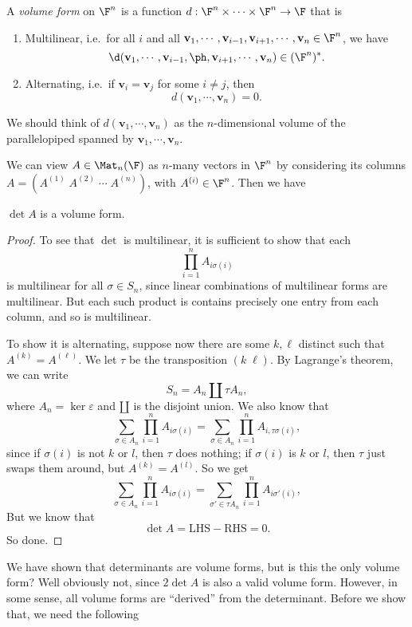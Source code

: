 \documentclass[a4paper]{article}
\begin{document}
\begin{defi}
  A \emph{volume form} on $\F^n$ is a function $d: \F^n \times \cdots \times \F^n \to \F$ that is
  \begin{enumerate}
    \item Multilinear, i.e.\ for all $i$ and all $\mathbf{v}_1, \cdots, \mathbf{v}_{i - 1}, \mathbf{v}_{i + 1}, \cdots, \mathbf{v}_n \in \F^n$, we have
      \[
        \d (\mathbf{v}_1, \cdots, \mathbf{v}_{i - 1}, \ph, \mathbf{v}_{i + 1}, \cdots, \mathbf{v}_n) \in (\F^n)^*.
      \]
    \item Alternating, i.e.\ if $\mathbf{v}_i = \mathbf{v}_j$ for some $i \not= j$, then
      \[
        d(\mathbf{v}_1, \cdots, \mathbf{v}_n) = 0.
      \]
  \end{enumerate}
\end{defi}
We should think of $d(\mathbf{v}_1, \cdots, \mathbf{v}_n)$ as the $n$-dimensional volume of the parallelopiped spanned by $\mathbf{v}_1, \cdots, \mathbf{v}_n$.

We can view $A \in \Mat_n(\F)$ as $n$-many vectors in $\F^n$ by considering its columns $A = (A^{(1)}\; A^{(2)}\; \cdots \; A^{(n)})$, with $A^{(i)} \in \F^n$. Then we have
\begin{lemma}
  $\det A$ is a volume form.
\end{lemma}

\begin{proof}
  To see that $\det$ is multilinear, it is sufficient to show that each
  \[
    \prod_{i = 1}^n A_{i \sigma(i)}
  \]
  is multilinear for all $\sigma \in S_n$, since linear combinations of multilinear forms are multilinear. But each such product is contains precisely one entry from each column, and so is multilinear.

  To show it is alternating, suppose now there are some $k, \ell$ distinct such that $A^{(k)} = A^{(\ell)}$. We let $\tau$ be the transposition $(k\; \ell)$. By Lagrange's theorem, we can write
  \[
    S_n = A_n \amalg \tau A_n,
  \]
  where $A_n = \ker \varepsilon$ and $\amalg$ is the disjoint union. We also know that
  \[
    \sum_{\sigma \in A_n} \prod_{i = 1}^n A_{i \sigma (i)} = \sum_{\sigma \in A_n} \prod_{i = 1}^n A_{i, \tau\sigma(i)},
  \]
  since if $\sigma(i)$ is not $k$ or $l$, then $\tau$ does nothing; if $\sigma(i)$ is $k$ or $l$, then $\tau$ just swaps them around, but $A^{(k)} = A^{(l)}$. So we get
  \[
    \sum_{\sigma \in A_n} \prod_{i = 1}^n A_{i \sigma (i)} = \sum_{\sigma' \in \tau A_n} \prod_{i = 1}^n A_{i\sigma'(i)},
  \]
  But we know that
  \[
    \det A = \text{LHS} - \text{RHS} = 0.
  \]
  So done.
\end{proof}
We have shown that determinants are volume forms, but is this the only volume form? Well obviously not, since $2 \det A$ is also a valid volume form. However, in some sense, all volume forms are ``derived'' from the determinant. Before we show that, we need the following
\end{document}
